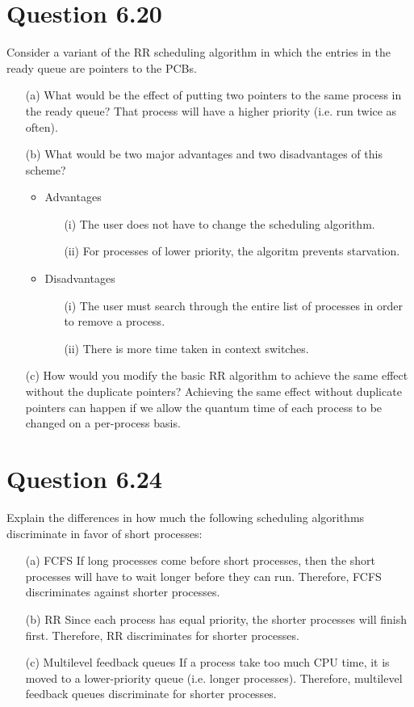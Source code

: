 \documentclass[12pt]{article}
\begin{document}
\section*{Question 6.20} {\color{blue}Consider a variant of the RR scheduling algorithm in which the entries in the ready queue are pointers to the PCBs.
\begin{enumerate}
\item[(a)]What would be the effect of putting two pointers to the same process in the ready queue? {\color{black} That process will have a higher priority (i.e. run twice as often). }
\item[(b)]What would be two major advantages and two disadvantages of this scheme?
{\color{black}
\begin{itemize}
\item Advantages
\begin{enumerate}
\item[(i)]The user does not have to change the scheduling algorithm.
\item[(ii)]For processes of lower priority, the algoritm prevents starvation.
\end{enumerate}
\item Disadvantages
\begin{enumerate}
\item[(i)]The user must search through the entire list of processes in order to remove a process.
\item[(ii)]There is more time taken in context switches.
\end{enumerate}
\end{itemize}
}
\item[(c)]How would you modify the basic RR algorithm to achieve the same effect without the duplicate pointers? {\color{black} Achieving the same effect without duplicate pointers can happen if we allow the quantum time of each process to be changed on a per-process basis.}
\end{enumerate}
}

\section*{Question 6.24} {\color{blue}Explain the differences in how much the following scheduling algorithms discriminate in favor of short processes:
\begin{enumerate}
\item[(a)]FCFS {\color{black} If long processes come before short processes, then the short processes will have to wait longer before they can run. Therefore, FCFS discriminates against shorter processes.}
\item[(b)]RR {\color{black} Since each process has equal priority, the shorter processes will finish first. Therefore, RR discriminates for shorter processes. }
\item[(c)]Multilevel feedback queues {\color{black} If a process take too much CPU time, it is moved to a lower-priority queue (i.e. longer processes). Therefore, multilevel feedback queues discriminate for shorter processes.}
\end{enumerate}
}
\end{document}
